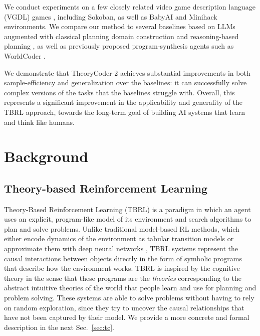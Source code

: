\documentclass{article}
\theoremstyle{plain}
\theoremstyle{definition}
\theoremstyle{remark}
\begin{document}
We conduct experiments on a few closely related video game description language (VGDL) games \citep{schaul2013video}, including Sokoban, as well as BabyAI \citep{babyai_iclr19} and {Minihack \citep{samvelyan2021minihack} environments}. We compare our method to several baselines based on LLMs augmented with classical planning domain construction \citep{liu2023llm+, guan2023leveraging, smirnov2024generating} and reasoning-based planning \citep{yao2023react, wei2022chain, yao2023tree}, as well as previously proposed program-synthesis agents such as WorldCoder \citep{tang2024worldcoder}.

We demonstrate that TheoryCoder-2 achieves substantial improvements in both sample-efficiency and generalization over the baselines: it can successfully solve complex versions of the tasks that the baselines struggle with.
Overall, this represents a significant improvement in the applicability and generality of the TBRL approach, towards the long-term goal of building AI systems that learn and think like humans.

\section{Background}
\label{sec:background}

\subsection{Theory-based Reinforcement Learning}

Theory-Based Reinforcement Learning (TBRL) is a paradigm in which an agent uses an explicit, program-like model of its environment and search algorithms to plan and solve problems. Unlike traditional model-based RL methods, which either encode dynamics of the environment as tabular transition models \citep{sutton90,kaelbling1996reinforcement,kaelbling1998planning} or approximate them with deep neural networks \citep{Schmidhuber90diff,schmidhuber2015learning,pascanu2017learning,Weber17,ha2018recurrent,HafnerLB020}, TBRL systems represent the causal interactions between objects directly in the form of symbolic programs that describe how the environment works. TBRL is inspired by the cognitive theory in the sense that these programs are the \textit{theories} corresponding to the abstract intuitive theories of the world that people learn and use for planning and problem solving.
These systems are able to solve problems without having to rely on random exploration, since they try to uncover the causal relationships that have not been captured by their model. We provide a more concrete and formal description in the next Sec.~\ref{sec:tc}.
\end{document}
